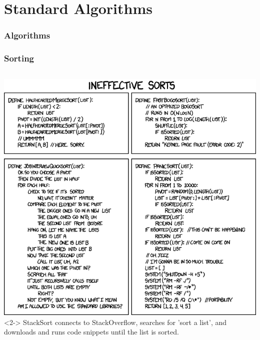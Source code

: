 \section{Standard Algorithms}

\begin{frame}[fragile]
\frametitle{Algorithms}
\framesubtitle{}


\end{frame}


\begin{frame}[fragile]
\frametitle{Sorting}
\begin{columns}[t]

\includegraphics[scale=0.3]{ineffective_sorts.png}
<2->
\vskip 24pt
StackSort connects to StackOverflow, searches for 'sort a list', and downloads and runs code snippets until the list is sorted.
\end{columns}

\end{frame}

